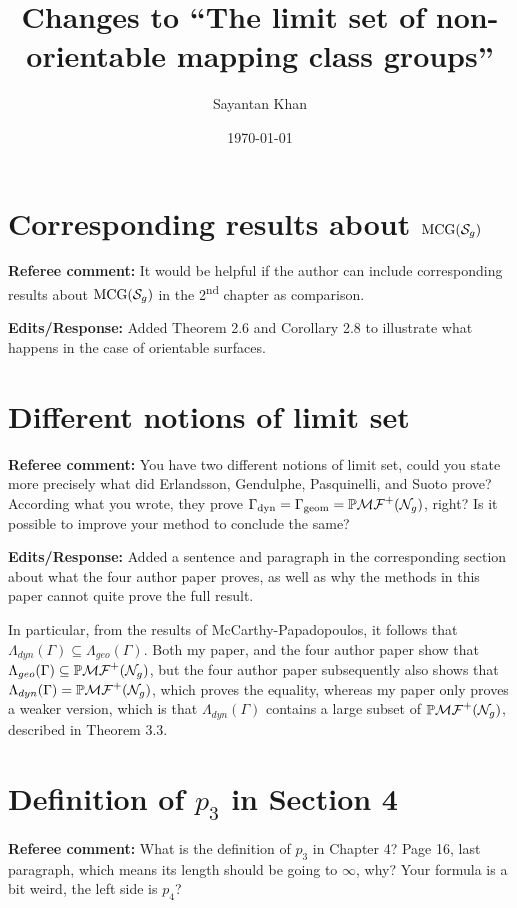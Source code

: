 \documentclass[12pt, reqno]{amsart}
\title{Changes to ``The limit set of non-orientable mapping class groups''}
\author{Sayantan Khan}
\date{\today}
\begin{document}
\maketitle

\section{Corresponding results about $\mathrm{MCG}(\mathcal{S}_g)$}
\label{sec:corr-results-about}

\textbf{Referee comment:} It would be helpful if the author can include corresponding results about $\mathrm{MCG}(\mathcal{S}_g)$ in the 2\textsuperscript{nd} chapter as comparison.

\textbf{Edits/Response:} Added Theorem 2.6 and Corollary 2.8 to illustrate what happens in the case of orientable surfaces.

\section{Different notions of limit set}
\label{sec:diff-noti-limit}

\textbf{Referee comment:} You have two different notions of limit set, could you state more precisely what did Erlandsson, Gendulphe, Pasquinelli, and Suoto prove? According what you wrote, they prove $\Gamma_{\text{dyn}} = \Gamma_{\text{geom}} = \mathbb{P}\mathcal{MF}^+(\mathcal{N}_g)$, right? Is it possible to improve your method to conclude the same?

\textbf{Edits/Response:} Added a sentence and paragraph in the corresponding section about what the four author paper proves, as well as why the methods in this paper cannot quite prove the full result.

In particular, from the results of McCarthy-Papadopoulos, it follows that $\Lambda_{dyn}(\Gamma) \subseteq \Lambda_{geo}(\Gamma)$.
Both my paper, and the four author paper show that $\Lambda_{geo}(\Gamma) \subseteq \mathbb{P}\mathcal{MF}^+(\mathcal{N}_g)$, but the four author paper subsequently also shows that $\Lambda_{dyn}(\Gamma) = \mathbb{P}\mathcal{MF}^+(\mathcal{N}_g)$, which proves the equality, whereas my paper only proves a weaker version, which is that $\Lambda_{dyn}(\Gamma)$ contains a large subset of $\mathbb{P}\mathcal{MF}^+(\mathcal{N}_g)$, described in Theorem 3.3.

\section{Definition of $p_3$ in Section 4}
\label{sec:defin-p_3-sect}

\textbf{Referee comment:} What is the definition of $p_3$ in Chapter 4? Page 16, last paragraph, which means its length should be going to $\infty$, why? Your formula is a bit weird, the left side is $p_4$?
\end{document}
